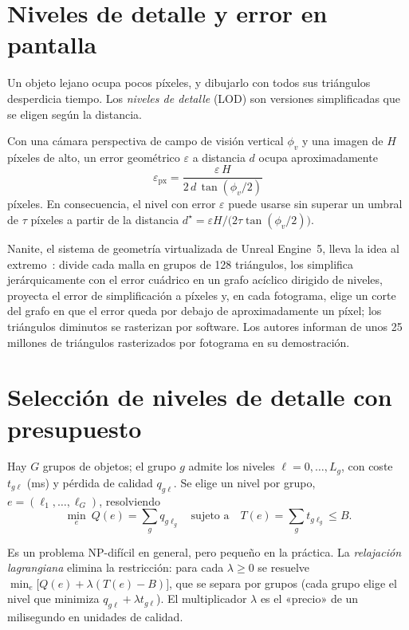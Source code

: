 \section{Niveles de detalle y error en pantalla}

Un objeto lejano ocupa pocos píxeles, y dibujarlo con todos sus triángulos desperdicia tiempo. Los \emph{niveles de detalle} (LOD) son versiones simplificadas que se eligen según la distancia.

\begin{proposicion}\label{prop:error-px}
Con una cámara perspectiva de campo de visión vertical $\phi_v$ y una imagen de $H$ píxeles de alto, un error geométrico $\varepsilon$ a distancia $d$ ocupa aproximadamente
\[
\varepsilon_{\text{px}}=\frac{\varepsilon\,H}{2\,d\,\tan(\phi_v/2)}
\]
píxeles. En consecuencia, el nivel con error $\varepsilon$ puede usarse sin superar un umbral de $\tau$ píxeles a partir de la distancia $d^\star=\varepsilon H/\bigl(2\tau\tan(\phi_v/2)\bigr)$.
\end{proposicion}

Nanite, el sistema de geometría virtualizada de Unreal Engine~5, lleva la idea al extremo~\cite{nanite}: divide cada malla en grupos de 128 triángulos, los simplifica jerárquicamente con el error cuádrico en un grafo acíclico dirigido de niveles, proyecta el error de simplificación a píxeles y, en cada fotograma, elige un corte del grafo en que el error queda por debajo de aproximadamente un píxel; los triángulos diminutos se rasterizan por software. Los autores informan de unos 25 millones de triángulos rasterizados por fotograma en su demostración.

\section{Selección de niveles de detalle con presupuesto}

\begin{definicion}\label{def:mckp}
Hay $G$ grupos de objetos; el grupo $g$ admite los niveles $\ell=0,\dots,L_g$, con coste $t_{g\ell}$ (ms) y pérdida de calidad $q_{g\ell}$. Se elige un nivel por grupo, $e=(\ell_1,\dots,\ell_G)$, resolviendo
\[
\min_e\ Q(e)=\sum_gq_{g\ell_g}\quad\text{sujeto a}\quad T(e)=\sum_gt_{g\ell_g}\le B .
\]
\end{definicion}

Es un problema NP-difícil en general, pero pequeño en la práctica. La \emph{relajación lagrangiana} elimina la restricción: para cada $\lambda\ge 0$ se resuelve $\min_e\bigl[Q(e)+\lambda(T(e)-B)\bigr]$, que se separa por grupos (cada grupo elige el nivel que minimiza $q_{g\ell}+\lambda t_{g\ell}$). El multiplicador $\lambda$ es el «precio» de un milisegundo en unidades de calidad.

